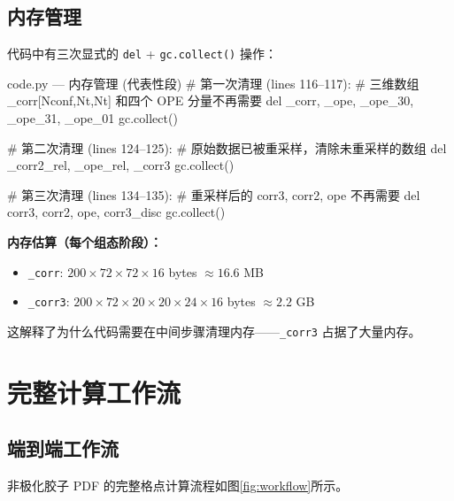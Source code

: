 \documentclass[12pt,a4paper]{ctexart}
\begin{document}
\subsection{内存管理}

代码中有三次显式的 \texttt{del} + \texttt{gc.collect()} 操作：

\begin{codeblock}{code.py --- 内存管理 (代表性段)}
# 第一次清理 (lines 116--117):
# 三维数组 _corr[Nconf,Nt,Nt] 和四个 OPE 分量不再需要
del _corr, _ope, _ope_30, _ope_31, _ope_01
gc.collect()

# 第二次清理 (lines 124--125):
# 原始数据已被重采样，清除未重采样的数组
del _corr2_rel, _ope_rel, _corr3
gc.collect()

# 第三次清理 (lines 134--135):
# 重采样后的 corr3, corr2, ope 不再需要
del corr3, corr2, ope, corr3_disc
gc.collect()
\end{codeblock}

\textbf{内存估算（每个组态阶段）：}
\begin{itemize}
    \item \texttt{\_corr}: $200 \times 72 \times 72 \times 16$ bytes $\approx 16.6$ MB
    \item \texttt{\_corr3}: $200 \times 72 \times 20 \times 20 \times 24 \times 16$ bytes
        $\approx 2.2$ GB
\end{itemize}

这解释了为什么代码需要在中间步骤清理内存——\texttt{\_corr3} 占据了大量内存。


\section{完整计算工作流}\label{sec:workflow}

\subsection{端到端工作流}

非极化胶子 PDF 的完整格点计算流程如图\ref{fig:workflow}所示。
\end{document}
